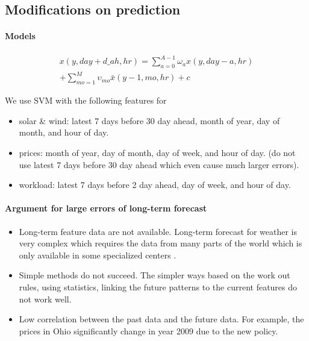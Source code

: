 
\subsection{Modifications on prediction}

\paragraph{Models}

\begin{align}
x(y, day+d\_ah,hr) = \sum_{a=0}^{A-1} \omega_a x(y, day-a,hr) \nonumber \\
+ \sum_{mo=1}^{M} \upsilon_{mo} \bar{x}(y-1, mo, hr) + c
\end{align}


We use SVM with the following features for
\begin{itemize}
	\item solar \& wind: latest 7 days before 30 day ahead, month of year, day of month, and hour of day.	
	\item prices: month of year, day of month, day of week, and hour of day. (do not use latest 7 days before 30 day ahead which even cause much larger errors).
	\item workload: latest 7 days before 2 day ahead, day of week, and hour of day.
\end{itemize}

\paragraph{Argument for large errors of long-term forecast}
\begin{itemize}
	\item Long-term feature data are not available. Long-term forecast for weather is very complex which requires the data from many parts of the world which is only available in some specialized centers \cite{wmoLongTermForecasting}.
	\item Simple methods do not succeed. The simpler ways based on the work out rules, using statistics, linking the future patterns to the current features do not work well. 
	\item Low correlation between the past data and the future data. For example, the prices in Ohio significantly change in year 2009 due to the new policy.
\end{itemize}

